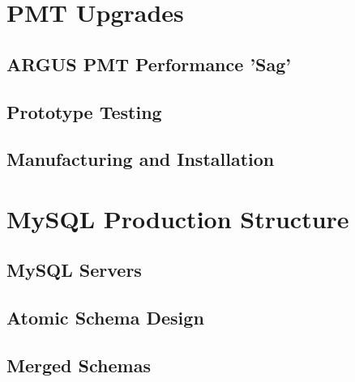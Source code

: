 
\chapter{PMT Upgrades}

\section{ARGUS PMT Performance 'Sag'}

\section{Prototype Testing}

\section{Manufacturing and Installation}

\chapter{MySQL Production Structure}

\section{MySQL Servers}

\section{Atomic Schema Design}

\section{Merged Schemas}
	
